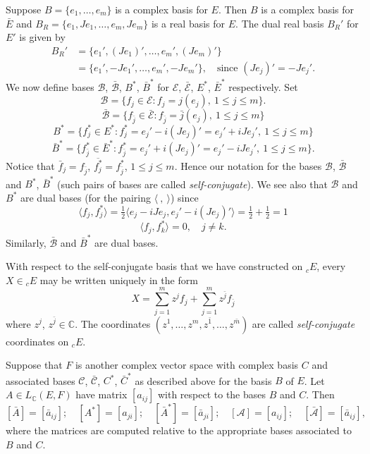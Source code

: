 Suppose $B=\{e_1,\ldots,e_m\}$ is a complex basis for $E$. Then $B$ is a complex basis for $\bar E$ and $B_R=\{e_1,Je_1,\ldots,e_m,Je_m\}$ is a real basis for $E$. The dual real basis $B_R'$ for $E'$ is given by
\[
\begin{split}
B_R'&=\{e_1',(Je_1)',\ldots,e_m',(Je_m)'\}\\
&=\{e_1',-Je_1',\ldots,e_m',-Je_m'\},\quad\text{since }(Je_j)'=-Je_j'.
\end{split}
\]
We now define bases $\mathcal B$, $\bar{\mathcal B}$, $B^*$, $\bar B^*$ for $\mathcal E$, $\bar{\mathcal E}$, $E^*$, $\bar E^*$ respectively. Set
\[
\mathcal B=\{f_j\in\mathcal E:f_j=j(e_j),\ 1\leq j\leq m\}.
\]
\[
\bar{\mathcal B}=\{f_{\bar j}\in\bar{\mathcal E}:f_{\bar j}=\bar j(e_j),\ 1\leq j\leq m\}
\]
\[
B^*=\{f_j^*\in E^*:f_j^*=e_j'-i(Je_j)'=e_j'+iJe_j',\ 1\leq j\leq m\}
\]
\[
\bar B^*=\{f_{\bar j}^*\in\bar E^*:f_{\bar j}^*=e_j'+i(Je_j)'=e_j'-iJe_j',\ 1\leq j\leq m\}.
\]
Notice that $\bar f_j=f_{\bar j}$, $\overline{f_j^*}=f_{\bar j}^*$, $1\leq j\leq m$. Hence our notation for the bases $\mathcal B$, $\bar{\mathcal B}$ and $B^*$, $\bar B^*$ (such pairs of bases are called \emph{self-conjugate}). We see also that $\mathcal B$ and $B^*$ are dual bases (for the pairing $\langle\ ,\ \rangle$) since
\[
\langle f_j,f_j^*\rangle=\tfrac12\langle e_j-iJe_j,e_j'-i(Je_j)'\rangle=\tfrac12+\tfrac12=1
\]
\[
\langle f_j,f_k^*\rangle=0,\quad j\neq k.
\]
Similarly, $\bar{\mathcal B}$ and $\bar B^*$ are dual bases.

With respect to the self-conjugate basis that we have constructed on ${}_cE$, every $X\in{}_cE$ may be written uniquely in the form
\[
X=\sum_{j=1}^m z^j f_j+\sum_{j=1}^m z^{\bar j}f_{\bar j}
\]
where $z^j$, $z^{\bar j}\in\mathbb C$. The coordinates $(z^1,\ldots,z^m,z^{\bar1},\ldots,z^{\bar m})$ are called \emph{self-conjugate} coordinates on ${}_cE$.

Suppose that $F$ is another complex vector space with complex basis $C$ and associated bases $\mathcal C$, $\bar{\mathcal C}$, $C^*$, $\bar C^*$ as described above for the basis $B$ of $E$. Let $A\in L_{\mathbb C}(E,F)$ have matrix $[a_{ij}]$ with respect to the bases $B$ and $C$. Then
\[
[\bar A]=[\bar a_{ij}];\quad[A^*]=[a_{ji}];\quad[\bar A^*]=[\bar a_{ji}];\quad[\mathcal A]=[a_{ij}];\quad[\bar{\mathcal A}]=[\bar a_{ij}],
\]
where the matrices are computed relative to the appropriate bases associated to $B$ and $C$.

